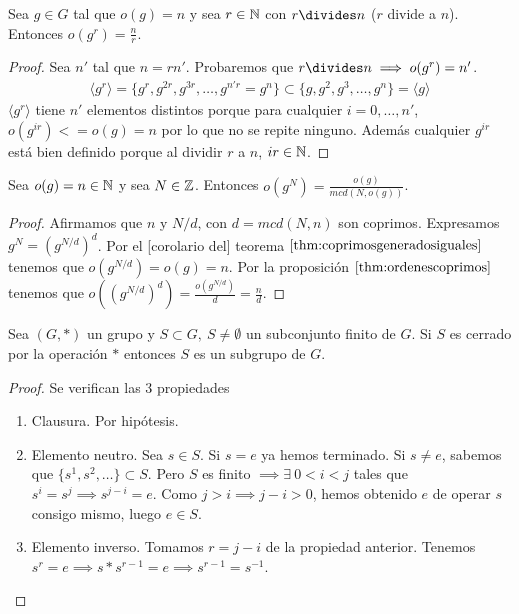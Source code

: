 \begin{pro}
	\label{thm:ordenescoprimos}
	Sea $g \in G$ tal que $o(g) = n$ y sea $r \in \mathbb{N}$ con $r \divides n$ ($r$ divide a $n$). Entonces $o(g^r) = \frac{n}{r}$.
\end{pro}

\begin{proof}
	Sea $n'$ tal que $n = rn'$. Probaremos que $r\divides n \implies o(g^r) = n'$.
	\begin{align*}
		\langle g^r \rangle = \{g^r, g^{2r}, g^{3r}, \dots, g^{n'r} = g^n\} \subset \{g, g^2, g^3, \dots, g^n\} = \langle g \rangle
	\end{align*}
	$\langle g^r \rangle$ tiene $n'$ elementos distintos porque para cualquier $i = 0,\dots, n'$, $o(g^{ir}) <= o(g) = n$ por lo que no se repite ninguno. Además cualquier $g^{ir}$ está bien definido porque al dividir $r$ a $n$, $ir \in \mathbb{N}$.
\end{proof}

\begin{thm}
	Sea $o(g) = n \in \mathbb{N}$ y sea $N \in \mathbb{Z}$. Entonces $o(g^N) = \frac{o(g)}{mcd(N, o(g))}$.
\end{thm}

\begin{proof}
	Afirmamos que $n$ y $N/d$, con $d = mcd(N,n)$ son coprimos. Expresamos $g^N = (g^{N/d})^d$. Por el [corolario del] teorema $\ref{thm:coprimosgeneradosiguales}$ tenemos que $o(g^{N/d}) = o(g) = n$. Por la proposición $\ref{thm:ordenescoprimos}$ tenemos que $o((g^{N/d})^d) = \frac{o(g^{N/d})}{d} = \frac{n}{d}$.
\end{proof}

\begin{thm}
	\label{thm:subconjuntocerrado}
	Sea $(G, \ast)$ un grupo y $S \subset G,\ S \neq \emptyset$ un subconjunto finito de $G$. Si $S$ es cerrado por la operación $\ast$ entonces $S$ es un subgrupo de $G$.
\end{thm}

\begin{proof}
	Se verifican las 3 propiedades
	\begin{enumerate}
		\item Clausura. Por hipótesis.
		\item Elemento neutro. Sea $s \in S$. Si $s = e$ ya hemos terminado. Si $s \neq e$, sabemos que $\{s^1, s^2, \dots\} \subset S$. Pero $S$ es finito $\implies \exists\ 0 < i < j$ tales que $s^i = s^j \implies s^{j - i} = e$. Como $j > i \implies j - i > 0$, hemos obtenido $e$ de operar $s$ consigo mismo, luego $e \in S$.
		\item Elemento inverso. Tomamos $r = j - i$ de la propiedad anterior. Tenemos $s^r = e \implies s \ast s^{r-1} = e \implies s^{r-1} = s^{-1}$.
	\end{enumerate}
\end{proof}

